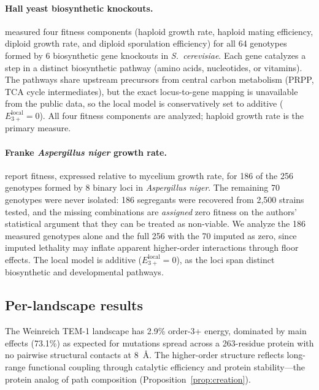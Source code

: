 \documentclass[10pt]{article}
\begin{document}
\paragraph{Hall yeast biosynthetic knockouts.}
\citet{hall2010fitness} measured four fitness components (haploid
growth rate, haploid mating efficiency, diploid growth rate, and
diploid sporulation efficiency) for all 64 genotypes formed by 6
biosynthetic gene knockouts in \emph{S.~cerevisiae}. Each gene catalyzes a step in a
distinct biosynthetic pathway (amino acids, nucleotides, or
vitamins). The pathways share upstream precursors from central
carbon metabolism (PRPP, TCA cycle intermediates), but the exact
locus-to-gene mapping is unavailable from the public data, so the
local model is conservatively set to additive
($E_{3+}^{\mathrm{local}} = 0$). All four fitness components are
analyzed; haploid growth rate is the primary measure.

\paragraph{Franke \emph{Aspergillus niger} growth rate.}
\citet{franke2011evolutionary} report fitness, expressed relative to
mycelium growth rate, for 186 of the 256 genotypes formed by 8 binary
loci in \emph{Aspergillus niger}. The remaining 70 genotypes were never
isolated: 186 segregants were recovered from 2{,}500 strains tested, and
the missing combinations are \emph{assigned} zero fitness on the
authors' statistical argument that they can be treated as non-viable.
We analyze the 186 measured genotypes alone and the full 256 with the
70 imputed as zero, since imputed lethality may inflate apparent
higher-order interactions through floor effects. The local model is additive
($E_{3+}^{\mathrm{local}} = 0$), as the loci span distinct
biosynthetic and developmental pathways.

\subsection*{Per-landscape results}

The Weinreich TEM-1 landscape has 2.9\% order-3+ energy, dominated
by main effects (73.1\%) as expected for mutations spread across a
263-residue protein with no pairwise structural contacts at 8~\AA.
The higher-order structure reflects long-range functional coupling
through catalytic efficiency and protein stability---the protein
analog of path composition (Proposition~\ref{prop:creation}).
\end{document}
